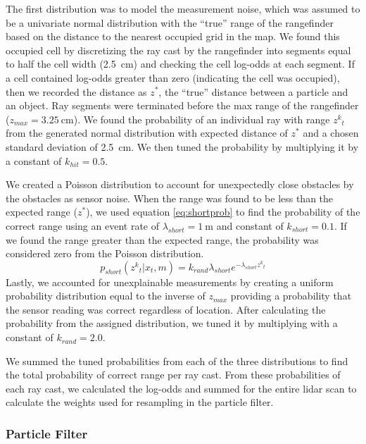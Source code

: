\documentclass[journal]{IEEEtran}
\begin{document}
            The first distribution was to model the measurement noise, which was assumed to be a univariate normal distribution with the “true” range of the rangefinder based on the distance to the nearest occupied grid in the map. We found this occupied cell by discretizing the ray cast by the rangefinder into segments equal to half the cell width (\SI{2.5}{\centi\meter}) and checking the cell log-odds at each segment. If a cell contained log-odds greater than zero (indicating the cell was occupied), then we recorded the distance as $z^{*}$, the “true” distance between a particle and an object. Ray segments were terminated before the max range of the rangefinder  ($z_{max}=\SI{3.25}{\centi\meter}$). We found the probability of an individual ray with range $ z{^k}_t $ from the generated normal distribution with expected distance of $z^{*}$ and a chosen standard deviation of \SI{2.5}{\centi\meter}. We then tuned the probability by multiplying it by a constant of $k_{hit}=0.5$.
            
            We created a Poisson distribution to account for unexpectedly close obstacles by the obstacles as sensor noise. When the range was found to be less than the expected range ($z^{*}$), we used equation \ref{eq:shortprob} to find the probability of the correct range using an event rate of $\lambda_{short} = \SI{1}{\meter}$ and constant of $k_{short} =0.1$. If we found the range greater than the expected range, the probability was considered zero from the Poisson distribution.
            \begin{equation}
            	\label{eq:shortprob}
            	p_{short}(z{^k}_t |x_t,m) = k_{rand}\lambda_{short}e^{-\lambda_{short}z{^k}_t}
            \end{equation}
            Lastly, we accounted for unexplainable measurements by creating a uniform probability distribution equal to the inverse of $z_{max}$ providing a probability that the sensor reading was correct regardless of location. After calculating the probability from the assigned distribution, we tuned it by multiplying with a constant of $k_{rand}=2.0$.
            
            We summed the tuned probabilities from each of the three distributions to find the total probability of correct range per ray cast. From these probabilities of each ray cast, we calculated the log-odds and summed for the entire lidar scan to calculate the weights used for resampling in the particle filter.
            
        \subsubsection{Particle Filter}
        
\end{document}
